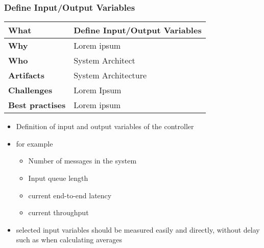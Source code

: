 \subsubsection{Define Input/Output Variables}
\begin{minipage}{\textwidth}
 \label{table:ch6_Task_Define_Controller_Variables}
\begin{tabular}
	{|m{3cm}|m{10cm}|} \hline \bfseries What & Define Input/Output Variables\\
	\hline \bfseries Why & Lorem ipsum\\
	\hline \bfseries Who & System Architect\\
	\hline \bfseries Artifacts & System Architecture\\
	\hline \bfseries Challenges & Lorem Ipsum\\
	\hline \bfseries Best practises & Lorem ipsum\\
	\hline 
\end{tabular}
\end{minipage}

\begin{itemize}
	\item Definition of input and output variables of the controller
	\item for example
	\begin{itemize}
		\item Number of messages in the system
		\item Input queue length
		\item current end-to-end latency
		\item current throughput
	\end{itemize}
	\item selected input variables should be measured easily and directly, without delay such as when calculating averages
\end{itemize}

